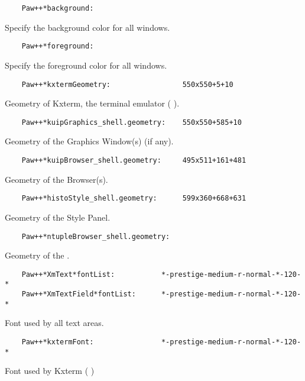 \begin{verbatim}
    Paw++*background:
\end{verbatim}

   Specify the background color for all windows.

\begin{verbatim}
    Paw++*foreground:
\end{verbatim}

   Specify the foreground color for all windows.

\begin{verbatim}
    Paw++*kxtermGeometry:                 550x550+5+10
\end{verbatim}

Geometry of Kxterm, the \KUIP{} terminal emulator (\PAWPP{} \EW).

\begin{verbatim}
    Paw++*kuipGraphics_shell.geometry:    550x550+585+10
\end{verbatim}

   Geometry of the Graphics Window(s) (if any).

\begin{verbatim}
    Paw++*kuipBrowser_shell.geometry:     495x511+161+481
\end{verbatim}

   Geometry of the Browser(s).

\begin{verbatim}
    Paw++*histoStyle_shell.geometry:      599x360+668+631
\end{verbatim}

   Geometry of the Style Panel.

\begin{verbatim}
    Paw++*ntupleBrowser_shell.geometry:
\end{verbatim}

   Geometry of the \NV.

\begin{verbatim}
    Paw++*XmText*fontList:           *-prestige-medium-r-normal-*-120-*
    Paw++*XmTextField*fontList:      *-prestige-medium-r-normal-*-120-*
\end{verbatim}

   Font used by all text areas.

\begin{verbatim}
    Paw++*kxtermFont:                *-prestige-medium-r-normal-*-120-*
\end{verbatim}

   Font used by Kxterm (\PAWPP{} \EW)

